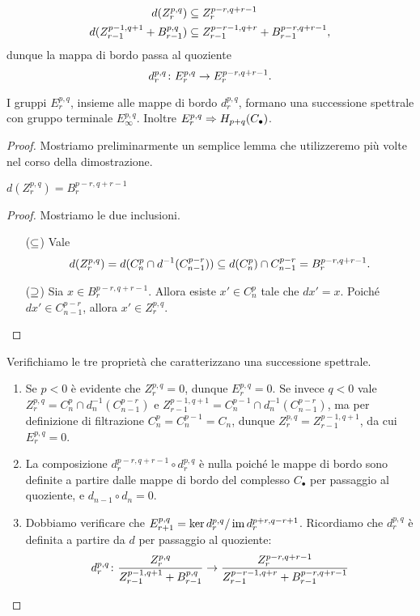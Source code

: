 \begin{align*}
d(Z^{p,q}_r)&\subseteq Z^{p-r,q+r-1}_r\\
d(Z^{p-1,q+1}_{r-1}+B^{p,q}_{r-1})&\subseteq Z^{p-r-1,q+r}_{r-1}+B^{p-r,q+r-1}_{r-1},
\end{align*}
dunque la mappa di bordo passa al quoziente
$$
d^{p,q}_r\colon E^{p,q}_r\to E^{p-r,q+r-1}_r.
$$
\begin{proposition}
I gruppi $E^{p,q}_r$, insieme alle mappe di bordo $d^{p,q}_r$, formano una successione spettrale con gruppo terminale $E^{p,q}_\infty$. Inoltre $E^{p,q}_r\Rightarrow H_{p+q}(C_\bullet)$.
\end{proposition}
\begin{proof}
Mostriamo preliminarmente un semplice lemma che utilizzeremo più volte nel corso della dimostrazione.
\begin{lemma*}
$d(Z^{p,q}_r)=B^{p-r,q+r-1}_r$
\end{lemma*}
\begin{proof}
Mostriamo le due inclusioni.
\begin{itemize}
\item[($\subseteq$)] Vale
$$
d(Z^{p,q}_r)=d(C^p_n\cap d^{-1}(C^{p-r}_{n-1}))\subseteq d(C^p_n)\cap C^{p-r}_{n-1}=B^{p-r,q+r-1}_r.
$$
\item[($\supseteq$)] Sia $x\in B^{p-r,q+r-1}_r$. Allora esiste $x'\in C^p_n$ tale che $dx'=x$. Poiché $dx'\in C^{p-r}_{n-1}$, allora $x'\in Z^{p,q}_r$.
\end{itemize}
\end{proof}
Verifichiamo le tre proprietà che caratterizzano una successione spettrale.
\begin{enumerate}
\item Se $p<0$ è evidente che $Z^{p,q}_r=0$, dunque $E^{p,q}_r=0$. Se invece $q<0$ vale $Z^{p,q}_r=C^p_n\cap d_n^{-1}(C^{p-r}_{n-1})$ e $Z^{p-1,q+1}_{r-1}=C^{p-1}_n\cap d_n^{-1}(C^{p-r}_{n-1})$, ma per definizione di filtrazione $C^p_n=C^{p-1}_n=C_n$, dunque $Z^{p,q}_r=Z^{p-1,q+1}_{r-1}$, da cui $E^{p,q}_r=0$.
\item La composizione $d^{p-r,q+r-1}_r\circ d^{p,q}_r$ è nulla poiché le mappe di bordo sono definite a partire dalle mappe di bordo del complesso $C_\bullet$ per passaggio al quoziente, e $d_{n-1}\circ d_n=0$.
\item Dobbiamo verificare che $E^{p,q}_{r+1}=\ker d^{p,q}_r/\operatorname{im} d^{p+r,q-r+1}_r$. Ricordiamo che $d^{p,q}_r$ è definita a partire da $d$ per passaggio al quoziente:
$$
d^{p,q}_r\colon\frac{Z^{p,q}_r}{Z^{p-1,q+1}_{r-1}+B^{p,q}_{r-1}}\to\frac{Z^{p-r,q+r-1}_r}{Z^{p-r-1,q+r}_{r-1}+B^{p-r,q+r-1}_{r-1}}
$$
\end{enumerate}
\end{proof}
